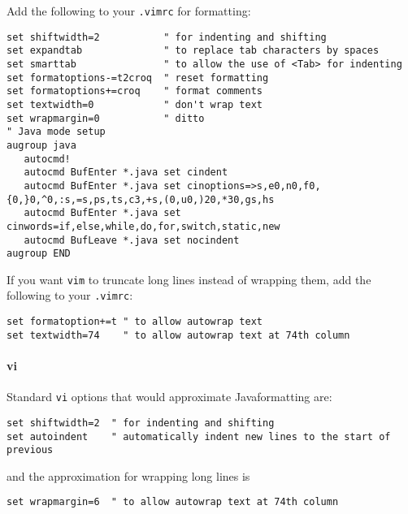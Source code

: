 Add the following to your {\tt .vimrc} for formatting:
\begin{verbatim}
set shiftwidth=2           " for indenting and shifting
set expandtab              " to replace tab characters by spaces
set smarttab               " to allow the use of <Tab> for indenting
set formatoptions-=t2croq  " reset formatting
set formatoptions+=croq    " format comments
set textwidth=0            " don't wrap text
set wrapmargin=0           " ditto
" Java mode setup
augroup java
   autocmd!
   autocmd BufEnter *.java set cindent
   autocmd BufEnter *.java set cinoptions=>s,e0,n0,f0,{0,}0,^0,:s,=s,ps,ts,c3,+s,(0,u0,)20,*30,gs,hs
   autocmd BufEnter *.java set cinwords=if,else,while,do,for,switch,static,new
   autocmd BufLeave *.java set nocindent
augroup END
\end{verbatim}
If you want {\tt vim} to truncate long lines instead of wrapping them, add
the following to your {\tt .vimrc}:
\begin{verbatim}
set formatoption+=t " to allow autowrap text
set textwidth=74    " to allow autowrap text at 74th column
\end{verbatim}

\paragraph{vi}\label{options:vi}

Standard {\tt vi} options that would approximate Java\trademark formatting are:
\begin{verbatim}
set shiftwidth=2  " for indenting and shifting
set autoindent    " automatically indent new lines to the start of previous
\end{verbatim}
and the approximation for wrapping long lines is
\begin{verbatim}
set wrapmargin=6  " to allow autowrap text at 74th column
\end{verbatim}

\JavaTMFooter


